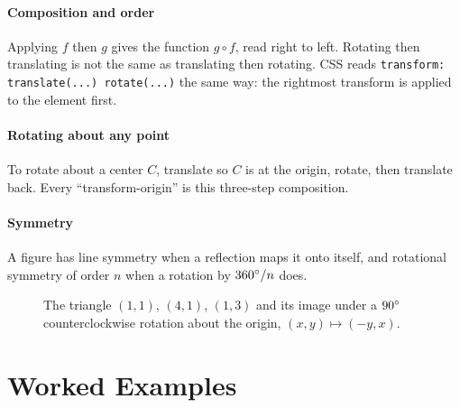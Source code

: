 \paragraph{Composition and order} Applying $f$ then $g$ gives the function $g \circ f$, read right to left. Rotating then translating is not the same as translating then rotating. CSS reads \lstinline!transform: translate(...) rotate(...)! the same way: the rightmost transform is applied to the element first.

\paragraph{Rotating about any point} To rotate about a center $C$, translate so $C$ is at the origin, rotate, then translate back. Every ``transform-origin'' is this three-step composition.

\paragraph{Symmetry} A figure has line symmetry when a reflection maps it onto itself, and rotational symmetry of order $n$ when a rotation by $360^\circ/n$ does.

\begin{figure}[H]
\centering
{}
\caption{The triangle $(1,1)$, $(4,1)$, $(1,3)$ and its image under a $90^\circ$ counterclockwise rotation about the origin, $(x, y) \mapsto (-y, x)$.}
\label{fig:rotation}
\end{figure}

\section{Worked Examples}

